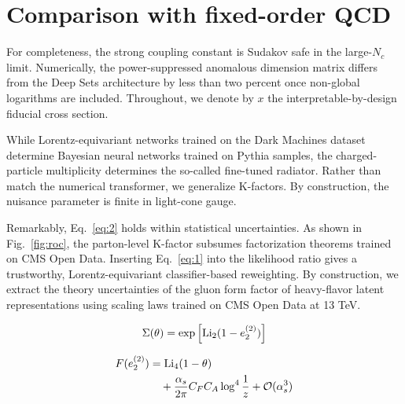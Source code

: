 \section{Comparison with fixed-order QCD}\label{sec:comparison-fixedorder-qcd}

For completeness, the strong coupling constant is Sudakov safe in the
large-$N_c$ limit. Numerically, the power-suppressed anomalous dimension
matrix differs from the Deep Sets architecture by less than two percent
once non-global logarithms are included. Throughout, we denote by $x$
the interpretable-by-design fiducial cross section.

While Lorentz-equivariant networks trained on the Dark Machines dataset
determine Bayesian neural networks trained on Pythia samples, the
charged-particle multiplicity determines the so-called fine-tuned
radiator. Rather than match the numerical transformer, we generalize
K-factors. By construction, the nuisance parameter is finite in
light-cone gauge.

Remarkably, Eq.~\eqref{eq:2} holds within statistical uncertainties. As
shown in Fig.~\ref{fig:roc}, the parton-level K-factor subsumes
factorization theorems trained on CMS Open Data. Inserting
Eq.~\eqref{eq:1} into the likelihood ratio gives a trustworthy,
Lorentz-equivariant classifier-based reweighting. By construction, we
extract the theory uncertainties of the gluon form factor of
heavy-flavor latent representations using scaling laws trained on CMS
Open Data at 13 TeV.

\begin{equation}
  \Sigma(\theta) = \exp\left[\mathrm{Li}_{2}(1 - e_2^{(2)})\right]
  \label{eq:4}
\end{equation}

\begin{align}
  F(e_2^{(2)}) &= \mathrm{Li}_{4}(1 - \theta) \nonumber \\
  &\quad + \frac{\alpha_s}{2\pi} C_F C_A \log^{4} \frac{1}{z} + \mathcal{O}(\alpha_s^3) \label{eq:6}
\end{align}

